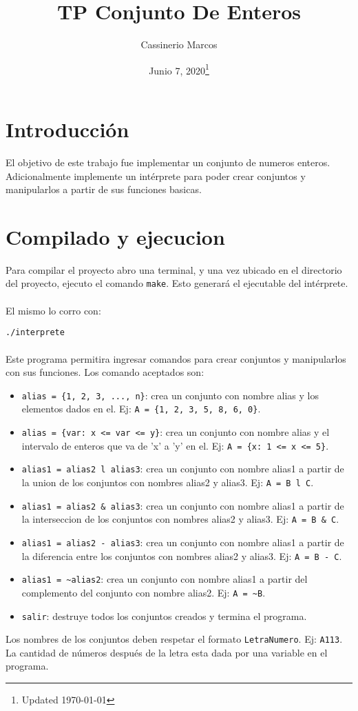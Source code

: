 \documentclass[]{article}
\begin{document}
	
\title{TP Conjunto De Enteros}
\author{Cassinerio Marcos}
\date{Junio 7, 2020\footnote{Updated \today}}
\maketitle
\newpage

\section{Introducción}
El objetivo de este trabajo fue implementar un conjunto de numeros enteros. Adicionalmente implemente un intérprete para poder crear conjuntos y manipularlos a partir de sus funciones basicas. 

\section{Compilado y ejecucion}
Para compilar el proyecto abro una terminal, y una vez ubicado en el directorio del proyecto, ejecuto el comando \verb|make|. Esto generará el ejecutable del intérprete.\\\\
El mismo lo corro con: 

\verb|./interprete|
\\\\Este programa permitira ingresar comandos para crear conjuntos y manipularlos con sus funciones. Los comando aceptados son:
 \begin{itemize}
 	\item \verb|alias = {1, 2, 3, ..., n}|: crea un conjunto con nombre alias y los elementos dados en el. Ej: \verb|A = {1, 2, 3, 5, 8, 6, 0}|.
 	\item \verb|alias = {var: x <= var <= y}|: crea un conjunto con nombre alias y el intervalo de enteros que va de 'x' a 'y' en el. Ej: \verb|A = {x: 1 <= x <= 5}|.
 	\item \verb|alias1 = alias2 l alias3|: crea un conjunto con nombre alias1 a partir de la union de los conjuntos con nombres alias2 y alias3. Ej: \verb|A = B l C|.
 	\item \verb|alias1 = alias2 & alias3|: crea un conjunto con nombre alias1 a partir de la interseccion de los conjuntos con nombres alias2 y alias3. Ej: \verb|A = B & C|.
 	\item \verb|alias1 = alias2 - alias3|: crea un conjunto con nombre alias1 a partir de la diferencia entre los conjuntos con nombres alias2 y alias3. Ej: \verb|A = B - C|.
    \item \verb|alias1 = ~alias2|: crea un conjunto con nombre alias1 a partir del complemento del conjunto con nombre alias2. Ej: \verb|A = ~B|.
 	\item \verb|salir|: destruye todos los conjuntos creados y termina el programa.
 \end{itemize}
Los nombres de los conjuntos deben respetar el formato \verb|LetraNumero|. Ej: \verb|A113|.
La cantidad de números después de la letra esta dada por una variable en el programa.
\end{document}
